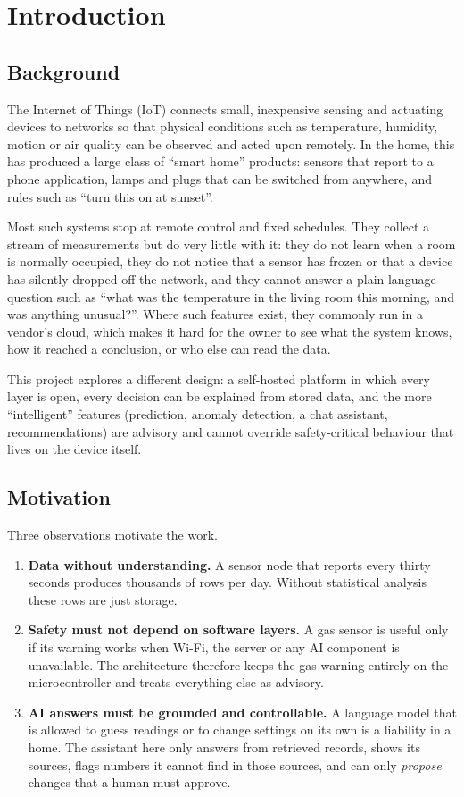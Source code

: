 \documentclass[12pt,a4paper,oneside]{report}
\begin{document}
\chapter{Introduction}

\section{Background}
The Internet of Things (IoT) connects small, inexpensive sensing and actuating devices to networks so that physical conditions such as temperature, humidity, motion or air quality can be observed and acted upon remotely. In the home, this has produced a large class of ``smart home'' products: sensors that report to a phone application, lamps and plugs that can be switched from anywhere, and rules such as ``turn this on at sunset''.

Most such systems stop at remote control and fixed schedules. They collect a stream of measurements but do very little with it: they do not learn when a room is normally occupied, they do not notice that a sensor has frozen or that a device has silently dropped off the network, and they cannot answer a plain-language question such as ``what was the temperature in the living room this morning, and was anything unusual?''. Where such features exist, they commonly run in a vendor's cloud, which makes it hard for the owner to see what the system knows, how it reached a conclusion, or who else can read the data.

This project explores a different design: a self-hosted platform in which every layer is open, every decision can be explained from stored data, and the more ``intelligent'' features (prediction, anomaly detection, a chat assistant, recommendations) are advisory and cannot override safety-critical behaviour that lives on the device itself.

\section{Motivation}
Three observations motivate the work.
\begin{enumerate}
  \item \textbf{Data without understanding.} A sensor node that reports every thirty seconds produces thousands of rows per day. Without statistical analysis these rows are just storage.
  \item \textbf{Safety must not depend on software layers.} A gas sensor is useful only if its warning works when Wi-Fi, the server or any AI component is unavailable. The architecture therefore keeps the gas warning entirely on the microcontroller and treats everything else as advisory.
  \item \textbf{AI answers must be grounded and controllable.} A language model that is allowed to guess readings or to change settings on its own is a liability in a home. The assistant here only answers from retrieved records, shows its sources, flags numbers it cannot find in those sources, and can only \emph{propose} changes that a human must approve.
\end{enumerate}
\end{document}
